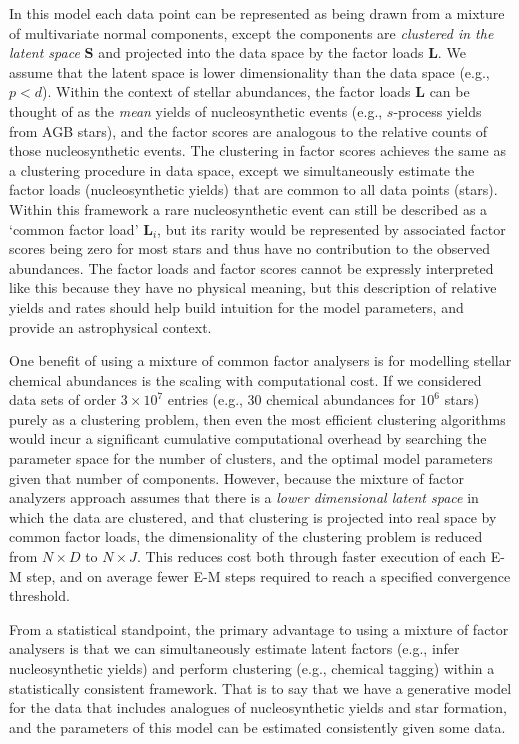 \documentclass[twocolumn]{aastex61}
\newcommand{\factorloads}{\textbf{L}}
\newcommand{\factorscores}{\textbf{S}}
\begin{document}
In this model each data point can be represented as being drawn
from a mixture of multivariate normal components, except the components
are \emph{clustered in the latent space} $\factorscores$ and projected
into the data space by the factor loads $\factorloads$. 
We assume that the latent space is lower dimensionality than the
data space (e.g., $p < d$).
Within the context of stellar abundances, the factor loads
$\factorloads$ can be thought of as the \emph{mean} yields
of nucleosynthetic
events (e.g., $s$-process yields from AGB stars), and the
factor scores are analogous to the relative counts of those 
nucleosynthetic events. The clustering in factor scores
achieves the same as a clustering procedure in data space,
except we simultaneously estimate the factor loads
(nucleosynthetic yields) that are common to all data points 
(stars). Within this framework a rare nucleosynthetic event
can still be described as a `common factor load' $\factorloads_i$, 
but its rarity would be represented by associated factor
scores being zero for most stars and thus have no contribution
to the observed abundances. The factor loads and factor scores 
cannot be expressly interpreted like this because they have no
physical meaning, but this description of relative yields and 
rates should help build intuition for the model parameters,
and provide an astrophysical context.


One benefit of using a mixture of common factor analysers is
for modelling stellar chemical abundances is the scaling with
computational cost. If we considered data sets of order $3\times10^7$
entries (e.g., 30 chemical abundances for $10^6$ stars) purely as a
clustering problem, then even the most efficient clustering
algorithms would incur a significant cumulative computational 
overhead by searching the parameter space for the number of
clusters, and the optimal model parameters given that number
of components. However, because the mixture of factor analyzers
approach assumes that there is a \emph{lower dimensional latent 
space} in which the data are clustered, and that clustering is 
projected into real space by common factor loads, the 
dimensionality of the clustering problem is reduced from 
$N \times D$ to $N \times J$. This reduces cost both through
faster execution of each E-M step, and on average fewer E-M steps
required to reach a specified convergence threshold.

From a statistical standpoint, the primary advantage to using
a mixture of factor analysers is that we can simultaneously
estimate latent factors (e.g., infer nucleosynthetic 
yields) and perform clustering (e.g., chemical tagging) 
within a statistically consistent framework. That is to say
that we have a generative model for the data that includes
analogues of nucleosynthetic yields and star formation,
and the parameters of this model can be estimated consistently
given some data.
\end{document}
